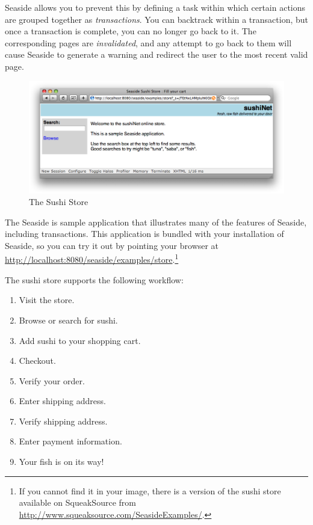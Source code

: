 \documentclass[a4paper,10pt,twoside]{book}
\begin{document}
{{Seaside allows you to prevent this by defining a task within which certain actions are grouped together as \emph{transactions}.
You can backtrack within a transaction, but once a transaction is complete, you can no longer go back to it.
The corresponding pages are \emph{invalidated}, and any attempt to go back to them will cause Seaside to generate a warning and redirect the user to the most recent valid page.

\begin{figure}[ht]
\begin{center}
\includegraphics[width=\textwidth]{sushiStore}
\caption{The Sushi Store}
\end{center}
\end{figure}

The Seaside  is sample application that illustrates many of the features of Seaside, including transactions.
This application is bundled with your installation of Seaside, so you can try it out by pointing your browser at
\url{http://localhost:8080/seaside/examples/store}.\footnote{If you cannot find it in your image, there is a version of the sushi store available on SqueakSource from \url{http://www.squeaksource.com/SeasideExamples/}.}

The sushi store supports the following workflow:
\begin{enumerate}[itemsep=0pt]
  \item Visit the store.
  \item Browse or search for sushi.
  \item Add sushi to your shopping cart.
  \item Checkout.
  \item Verify your order.
  \item Enter shipping address.
  \item Verify shipping address.
  \item Enter payment information.
  \item Your fish is on its way!
\end{enumerate}

}}
\end{document}
